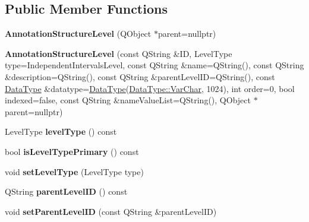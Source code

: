 \subsection*{Public Member Functions}
\begin{DoxyCompactItemize}
\item 
\mbox{\label{class_annotation_structure_level_a3d27dbadf04532e73024a2c9cd94a2da}} 
{\bfseries Annotation\+Structure\+Level} (Q\+Object $\ast$parent=nullptr)
\item 
\mbox{\label{class_annotation_structure_level_ab85043cd1f2e34a92fa205b97ef58ad5}} 
{\bfseries Annotation\+Structure\+Level} (const Q\+String \&ID, Level\+Type type=Independent\+Intervals\+Level, const Q\+String \&name=Q\+String(), const Q\+String \&description=Q\+String(), const Q\+String \&parent\+Level\+ID=Q\+String(), const \hyperlink{class_data_type}{Data\+Type} \&datatype=\hyperlink{class_data_type}{Data\+Type}(\hyperlink{class_data_type_a8df455d8d3949b604fbb2967dfeff239a160c768176611f2649889e252c756539}{Data\+Type\+::\+Var\+Char}, 1024), int order=0, bool indexed=false, const Q\+String \&name\+Value\+List=Q\+String(), Q\+Object $\ast$parent=nullptr)
\item 
\mbox{\label{class_annotation_structure_level_aa69940d5dd044fed5a848788633e3573}} 
Level\+Type {\bfseries level\+Type} () const
\item 
\mbox{\label{class_annotation_structure_level_acdac30a3532497e2995c4f7d0055476c}} 
bool {\bfseries is\+Level\+Type\+Primary} () const
\item 
\mbox{\label{class_annotation_structure_level_aee293305035809bcd57a3476912f7784}} 
void {\bfseries set\+Level\+Type} (Level\+Type type)
\item 
\mbox{\label{class_annotation_structure_level_a56eb69db99dbafbe878a84a59a97645b}} 
Q\+String {\bfseries parent\+Level\+ID} () const
\item 
\mbox{\label{class_annotation_structure_level_ae076985df9a024cab28a357d96ddbeed}} 
void {\bfseries set\+Parent\+Level\+ID} (const Q\+String \&parent\+Level\+ID)

\end{DoxyCompactItemize}
